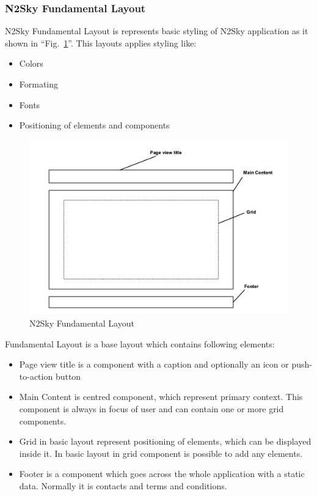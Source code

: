 \subsubsection{N2Sky Fundamental Layout}\label{N2Sky Fundamental Layout}

N2Sky Fundamental Layout is represents basic styling of N2Sky application as it shown in ``Fig.~\ref{fig:layout_basic}''. This layouts applies styling like:
\begin{itemize}
\item Colors
\item Formating
\item  Fonts
\item Positioning of elements and components
\end{itemize}

\begin{figure}[htbp]
\begin{center}
  \includegraphics[width=\linewidth]{components/3/components/layout_basic.png}
  \caption{N2Sky Fundamental Layout}
  \label{fig:layout_basic}
\end{center}
\end{figure}

Fundamental Layout is a base layout which contains following elements:
\begin{itemize}
\item Page view title is a component with a caption and optionally an icon or push-to-action button
\item Main Content is centred component, which represent primary context. This component is always in focus of user and can contain one or more grid components.
\item Grid in basic layout represent positioning of elements, which can be displayed inside it. In basic layout in grid component is possible to add any elements. 
\item Footer is a component which goes across the whole application with a static data. Normally it is contacts and terms and conditions. 
\end{itemize}


